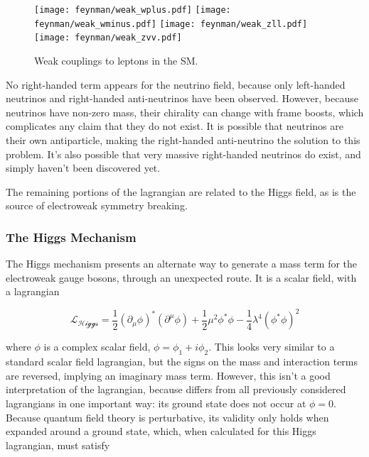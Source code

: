 \begin{centering}
\begin{figure}[!hbt]
\myfloatalign
\texttt{[image: feynman/weak\_wplus.pdf]}
\texttt{[image: feynman/weak\_wminus.pdf]}
\texttt{[image: feynman/weak\_zll.pdf]}
\texttt{[image: feynman/weak\_zvv.pdf]}
\caption{Weak couplings to leptons in the \ac{SM}.}
\label{fig:feynman_weak}
\end{figure}
\end{centering}

No right-handed term appears for the neutrino field, because only left-handed neutrinos and right-handed anti-neutrinos have been observed. However, because neutrinos have non-zero mass, their chirality can change with frame boosts, which complicates any claim that they do not exist. It is possible that neutrinos are their own antiparticle, making the right-handed anti-neutrino the solution to this problem. It's also possible that very massive right-handed neutrinos do exist, and simply haven't been discovered yet. 

The remaining portions of the lagrangian are related to the Higgs field, as is the source of electroweak symmetry breaking. 

\subsubsection{The Higgs Mechanism}

The Higgs mechanism presents an alternate way to generate a mass term for the electroweak gauge bosons, through an unexpected route. It is a scalar field, with a lagrangian 

\begin{equation}
\mathcal{L_{Higgs}} = \frac{1}{2}(\partial_\mu\phi)^*(\partial^\mu\phi) + \frac{1}{2}\mu^2\phi^*\phi - \frac{1}{4}\lambda^4(\phi^*\phi)^2
\end{equation}

where $\phi$ is a complex scalar field, $\phi = \phi_1 + i\phi_2$. This looks very similar to a standard scalar field lagrangian, but the signs on the mass and interaction terms are reversed, implying an imaginary mass term. However, this isn't a good interpretation of the lagrangian, because differs from all previously considered lagrangians in one important way: its ground state does not occur at $\phi = 0$. Because quantum field theory is perturbative, its validity only holds when expanded around a ground state, which, when calculated for this Higgs lagrangian, must satisfy


